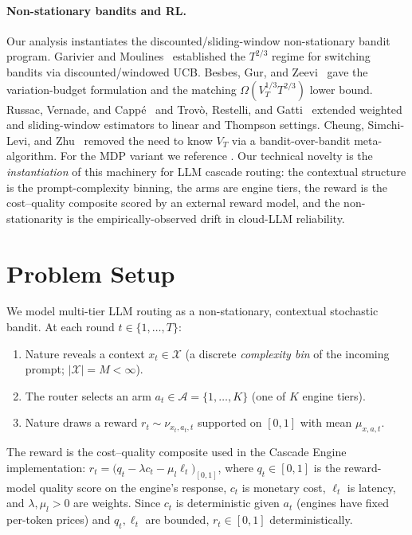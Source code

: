 \documentclass[11pt]{article}
\theoremstyle{definition}
\begin{document}
\paragraph{Non-stationary bandits and RL.}
Our analysis instantiates the discounted/sliding-window non-stationary
bandit program. Garivier and Moulines~\cite{garivier2008upper} established
the $T^{2/3}$ regime for switching bandits via discounted/windowed UCB.
Besbes, Gur, and Zeevi~\cite{besbes2014stochastic} gave the
variation-budget formulation and the matching
$\Omega(V_T^{1/3}T^{2/3})$ lower bound. Russac, Vernade, and
Capp{\'e}~\cite{russac2019weighted} and Trov{\`o}, Restelli, and
Gatti~\cite{trovo2020sliding} extended weighted and sliding-window
estimators to linear and Thompson settings. Cheung, Simchi-Levi, and
Zhu~\cite{cheung2019learning} removed the need to know $V_T$ via a
bandit-over-bandit meta-algorithm. For the MDP variant we reference
\cite{azar2017minimax,jin2018qlearning,domingues2021episodic}. Our
technical novelty is the \emph{instantiation} of this machinery for LLM
cascade routing: the contextual structure is the prompt-complexity
binning, the arms are engine tiers, the reward is the cost--quality
composite scored by an external reward model, and the non-stationarity is
the empirically-observed drift in cloud-LLM reliability.

\section{Problem Setup}
\label{sec:setup}

We model multi-tier LLM routing as a non-stationary, contextual stochastic
bandit. At each round $t \in \{1,\dots,T\}$:
\begin{enumerate}[leftmargin=*, itemsep=1pt, topsep=2pt]
\item Nature reveals a context $x_t \in \mathcal{X}$ (a discrete
\emph{complexity bin} of the incoming prompt; $|\mathcal{X}| = M < \infty$).
\item The router selects an arm $a_t \in \mathcal{A} = \{1,\dots,K\}$ (one
of $K$ engine tiers).
\item Nature draws a reward $r_t \sim \nu_{x_t, a_t, t}$ supported on
$[0,1]$ with mean $\mu_{x,a,t}$.
\end{enumerate}

The reward is the cost--quality composite used in the Cascade Engine
implementation:
$r_t = \big(q_t - \lambda c_t - \mu_l \ell_t\big)_{[0,1]}$, where
$q_t \in [0,1]$ is the reward-model quality score on the engine's response,
$c_t$ is monetary cost, $\ell_t$ is latency, and $\lambda, \mu_l > 0$ are
weights. Since $c_t$ is deterministic given $a_t$ (engines have fixed
per-token prices) and $q_t, \ell_t$ are bounded, $r_t \in [0,1]$
deterministically.
\end{document}
